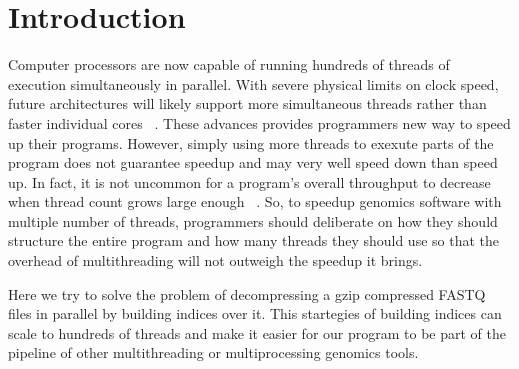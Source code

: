 \section{Introduction}
Computer processors are now capable of running hundreds of threads of execution simultaneously in parallel. With severe physical limits on clock speed, future architectures will likely support more simultaneous threads rather than faster individual cores ~\cite{intropaper}. These advances provides programmers new way to speed up their programs. However, simply using more threads to exexute parts of the program does not guarantee speedup and may very well speed down than speed up. In fact, it is not uncommon for a program’s overall throughput to decrease when thread count grows large enough ~\cite{intropaper}. So, to speedup genomics software with multiple number of threads, programmers should deliberate on how they should structure the entire program and how many threads they should use so that the overhead of multithreading will not outweigh the speedup it brings.

Here we try to solve the problem of decompressing a gzip compressed FASTQ files in parallel by building indices over it. 
This startegies of building indices can scale to hundreds of threads and make it easier for our program to be part of the pipeline of other multithreading or multiprocessing genomics tools. 
